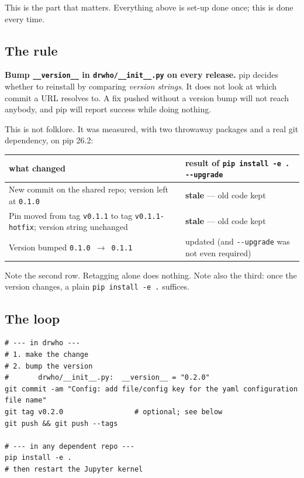 \documentclass[11pt,a4paper]{article}
\begin{document}
This is the part that matters. Everything above is set-up done once; this is done
every time.

\subsection{The rule}

\begin{rulebox}
\textbf{Bump \texttt{\_\_version\_\_} in \texttt{drwho/\_\_init\_\_.py} on every
release.} pip decides whether to reinstall by comparing \emph{version strings}.
It does not look at which commit a URL resolves to. A fix pushed without a
version bump will not reach anybody, and pip will report success while doing
nothing.
\end{rulebox}

This is not folklore. It was measured, with two throwaway packages and a real git
dependency, on pip 26.2:

\begin{center}
\small
\begin{tabular}{>{\raggedright\arraybackslash}p{7.3cm}l}
\toprule
what changed & result of \texttt{pip install -e . -{}-upgrade} \\
\midrule
New commit on the shared repo; version left at \texttt{0.1.0}
  & \textbf{stale} --- old code kept \\
Pin moved from tag \texttt{v0.1.1} to tag \texttt{v0.1.1-hotfix};
version string unchanged
  & \textbf{stale} --- old code kept \\
Version bumped \texttt{0.1.0}~$\rightarrow$~\texttt{0.1.1}
  & updated (and \texttt{-{}-upgrade} was not even required) \\
\bottomrule
\end{tabular}
\end{center}

Note the second row. Retagging alone does nothing. Note also the third: once the
version changes, a plain \texttt{pip install -e .} suffices.

\subsection{The loop}

\begin{lstlisting}[style=sh]
# --- in drwho ---
# 1. make the change
# 2. bump the version
#       drwho/__init__.py:  __version__ = "0.2.0"
git commit -am "Config: add file/config key for the yaml configuration file name"
git tag v0.2.0                 # optional; see below
git push && git push --tags

# --- in any dependent repo ---
pip install -e .
# then restart the Jupyter kernel
\end{lstlisting}
\end{document}
